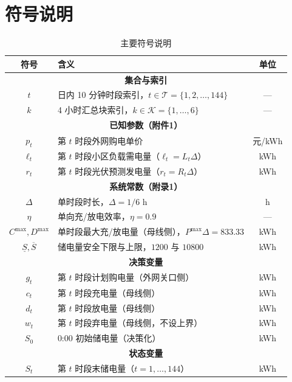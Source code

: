 \documentclass[withoutpreface,bwprint]{cumcmthesis} %
\begin{document}
\section{符号说明}
\begin{table}[H]
\centering
\caption{主要符号说明}
\begin{tabular}{clc}
\toprule
符号 & 含义 & 单位 \\
\midrule
\multicolumn{3}{c}{\textbf{集合与索引}} \\
$t$              & 日内 10 分钟时段索引，$t \in \mathcal{T} = \{1, 2, \dots, 144\}$   & ---     \\
$k$              & 4 小时汇总块索引，$k \in \mathcal{K} = \{1, \dots, 6\}$              & ---     \\
\midrule
\multicolumn{3}{c}{\textbf{已知参数（附件1）}} \\
$p_t$            & 第 $t$ 时段外网购电单价                                             & 元/kWh  \\
$\ell_t$         & 第 $t$ 时段小区负载需电量（$\ell_t = L_t \Delta$）                   & kWh     \\
$r_t$            & 第 $t$ 时段光伏预测发电量（$r_t = R_t \Delta$）                      & kWh     \\
\midrule
\multicolumn{3}{c}{\textbf{系统常数（附录1）}} \\
$\Delta$         & 单时段时长，$\Delta = 1/6$ h                                        & h       \\
$\eta$           & 单向充/放电效率，$\eta = 0.9$                                       & ---     \\
$C^{\max}, D^{\max}$ & 单时段最大充/放电量（母线侧），$P^{\max}\Delta = 833.33$          & kWh     \\
$\underline{S}, \overline{S}$ & 储电量安全下限与上限，$1200$ 与 $10800$                & kWh     \\
\midrule
\multicolumn{3}{c}{\textbf{决策变量}} \\
$g_t$            & 第 $t$ 时段计划购电量（外网关口侧）                                 & kWh     \\
$c_t$            & 第 $t$ 时段充电量（母线侧）                                         & kWh     \\
$d_t$            & 第 $t$ 时段放电量（母线侧）                                         & kWh     \\
$w_t$            & 第 $t$ 时段弃电量（母线侧，不设上界）                               & kWh     \\
$S_0$            & 0:00 初始储电量（决策化）                                           & kWh     \\
\midrule
\multicolumn{3}{c}{\textbf{状态变量}} \\
$S_t$            & 第 $t$ 时段末储电量（$t=1,\dots,144$）                              & kWh     \\
\bottomrule
\end{tabular}
\end{table}
\end{document}
